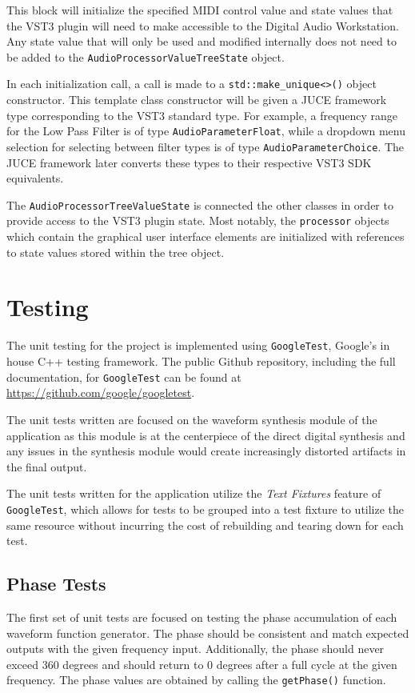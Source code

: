 \documentclass[a4paper,12pt]{report}
\begin{document}
This block will initialize the specified MIDI control value and state values that the VST3 plugin will need to make accessible to the Digital Audio Workstation. Any state value that will only be used and modified internally does not need to be added to the \texttt{AudioProcessorValueTreeState} object.

In each initialization call, a call is made to a \texttt{std::make\_unique<>()} object constructor. This template class constructor will be given a JUCE framework type corresponding to the VST3 standard type. For example, a frequency range for the Low Pass Filter is of type \texttt{AudioParameterFloat}, while a dropdown menu selection for selecting between filter types is of type \texttt{AudioParameterChoice}. The JUCE framework later converts these types to their respective VST3 SDK equivalents.

The \texttt{AudioProcessorTreeValueState} is connected the other classes in order to provide access to the VST3 plugin state. Most notably, the \texttt{processor} objects which contain the graphical user interface elements are initialized with references to state values stored within the tree object.

\section{Testing}
\label{sec:testing}
The unit testing for the project is implemented using \texttt{GoogleTest}, Google's in house C++ testing framework. The public Github repository, including the full documentation, for \texttt{GoogleTest} can be found at \href{https://github.com/google/googletest}{https://github.com/google/googletest}.

The unit tests written are focused on the waveform synthesis module of the application as this module is at the centerpiece of the direct digital synthesis and any issues in the synthesis module would create increasingly distorted artifacts in the final output.

The unit tests written for the application utilize the \emph{Text Fixtures} feature of \texttt{GoogleTest}, which allows for tests to be grouped into a test fixture to utilize the same resource without incurring the cost of rebuilding and tearing down for each test. 

\subsection{Phase Tests}
\label{subsec:phasetests}
The first set of unit tests are focused on testing the phase accumulation of each waveform function generator. The phase should be consistent and match expected outputs with the given frequency input. Additionally, the phase should never exceed 360 degrees and should return to 0 degrees after a full cycle at the given frequency. The phase values are obtained by calling the \texttt{getPhase()} function.
\end{document}
